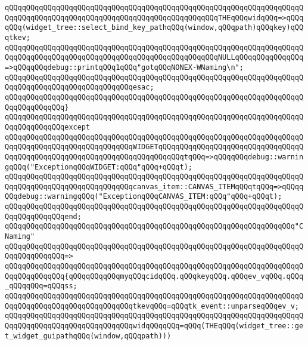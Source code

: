 \verb|qQQqqQQqqQQqqQQqqQQqqQQqqQQqqQQqqQQqqQQqqQQqqQQqqQQqqQQqqQQqqQQqqQQqqQQqqQQqqQQqqQQqqQQqqQQqqQQqqQQqqQQqqQQqqQQqqQQqqQQqTHEqQQqwidqQQq=>qQQqqQQq(widget_tree::select_bind_key_pathqQQq(window,qQQqpath)qQQqkey)qQQqtkev;|\newline
\verb|qQQqqQQqqQQqqQQqqQQqqQQqqQQqqQQqqQQqqQQqqQQqqQQqqQQqqQQqqQQqqQQqqQQqqQQqqQQqqQQqqQQqqQQqqQQqqQQqqQQqqQQqqQQqqQQqqQQqqQQqNULLqQQqqQQqqQQqqQQq=>qQQqqQQqdebug::printqQQq1qQQq"gotqQQqNONEX-WNaming\n";|\newline
\verb|qQQqqQQqqQQqqQQqqQQqqQQqqQQqqQQqqQQqqQQqqQQqqQQqqQQqqQQqqQQqqQQqqQQqqQQqqQQqqQQqqQQqqQQqqQQqqQQqqQQqesac;|\newline
\verb|qQQqqQQqqQQqqQQqqQQqqQQqqQQqqQQqqQQqqQQqqQQqqQQqqQQqqQQqqQQqqQQqqQQqqQQqqQQqqQQqqQQq}|\newline
\verb|qQQqqQQqqQQqqQQqqQQqqQQqqQQqqQQqqQQqqQQqqQQqqQQqqQQqqQQqqQQqqQQqqQQqqQQqqQQqqQQqqQQqexcept|\newline
\verb|qQQqqQQqqQQqqQQqqQQqqQQqqQQqqQQqqQQqqQQqqQQqqQQqqQQqqQQqqQQqqQQqqQQqqQQqqQQqqQQqqQQqqQQqqQQqqQQqqQQqWIDGETqQQqqQQqqQQqqQQqqQQqqQQqqQQqqQQqqQQqqQQqqQQqqQQqqQQqqQQqqQQqqQQqqQQqqQQqqQQqtqQQq=>qQQqqQQqdebug::warningqQQq("ExceptionqQQqWIDGET:qQQq"qQQq+qQQqt);|\newline
\verb|qQQqqQQqqQQqqQQqqQQqqQQqqQQqqQQqqQQqqQQqqQQqqQQqqQQqqQQqqQQqqQQqqQQqqQQqqQQqqQQqqQQqqQQqqQQqqQQqqQQqcanvas_item::CANVAS_ITEMqQQqtqQQq=>qQQqqQQqdebug::warningqQQq("ExceptionqQQqCANVAS_ITEM:qQQq"qQQq+qQQqt);|\newline
\verb|qQQqqQQqqQQqqQQqqQQqqQQqqQQqqQQqqQQqqQQqqQQqqQQqqQQqqQQqqQQqqQQqqQQqqQQqqQQqqQQqqQQqend;|\newline
\newline
\verb|qQQqqQQqqQQqqQQqqQQqqQQqqQQqqQQqqQQqqQQqqQQqqQQqqQQqqQQqqQQqqQQqqQQq"CNaming"|\newline
\verb|qQQqqQQqqQQqqQQqqQQqqQQqqQQqqQQqqQQqqQQqqQQqqQQqqQQqqQQqqQQqqQQqqQQqqQQqqQQqqQQqqQQq=>|\newline
\verb|qQQqqQQqqQQqqQQqqQQqqQQqqQQqqQQqqQQqqQQqqQQqqQQqqQQqqQQqqQQqqQQqqQQqqQQqqQQqqQQqqQQq{qQQqqQQqqQQqmyqQQqcidqQQq.qQQqkeyqQQq.qQQqev_vqQQq.qQQq_qQQqqQQq=qQQqss;|\newline
\verb|qQQqqQQqqQQqqQQqqQQqqQQqqQQqqQQqqQQqqQQqqQQqqQQqqQQqqQQqqQQqqQQqqQQqqQQqqQQqqQQqqQQqqQQqqQQqqQQqqQQqtkevqQQq=qQQqtk_event::unparseqQQqev_v;|\newline
\newline
\verb|qQQqqQQqqQQqqQQqqQQqqQQqqQQqqQQqqQQqqQQqqQQqqQQqqQQqqQQqqQQqqQQqqQQqqQQqqQQqqQQqqQQqqQQqqQQqqQQqqQQqwidqQQqqQQq=qQQq(THEqQQq(widget_tree::get_widget_guipathqQQq(window,qQQqpath)))|\newline
